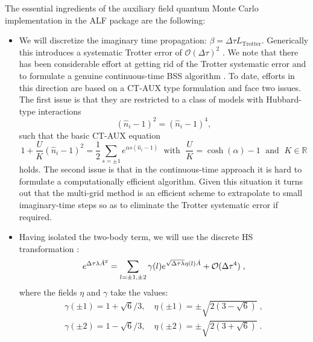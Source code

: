 \documentclass{SciPost}
\begin{document}
The essential ingredients of the auxiliary field quantum Monte Carlo implementation in the ALF package are the following:
\begin{itemize}
\item  We will discretize the imaginary time propagation: $\beta = \Delta \tau L_{\text{Trotter}} $. Generically this introduces a systematic Trotter error of $\mathcal{O}(\Delta \tau)^2$  \cite{Fye86}. 
We note that there has been considerable effort at getting rid of the Trotter systematic error and to 
formulate a genuine continuous-time BSS  algorithm \cite{Iazzi15}.   To date, efforts in this direction are based on a CT-AUX type formulation \cite{Rombouts99,Gull08} and   face  two issues. The first issue is that they are restricted to a class of models with Hubbard-type interactions
\begin{equation}
        \left(  \hat{n}_{i}- 1\right)^{2}  = \left(  \hat{n}_{i}- 1\right)^{4} ,
\end{equation}
such that  the  basic CT-AUX equation \cite{Rombouts98}
\begin{equation}
          1   + \frac{U}{K} \left(  \hat{n}_{i}- 1\right)^{2}    = \frac{1}{2}\sum_{s=\pm 1}   e^{ \alpha s \left(  \hat{n}_{i}- 1\right) }  \; \text{ with  }  \;  \frac{U}{K} = \cosh(\alpha) -1 \; \text{ and  }  \; K\in\mathbb{R}
\end{equation}
holds.
The second issue is that in the continuous-time  approach it is hard to formulate a  computationally efficient algorithm.  Given this situation it turns out that the multi-grid method \cite{Rost12,Rost13,Bluemer08}  is an efficient  scheme to   extrapolate to  small imaginary-time steps so as to  eliminate the Trotter systematic error if required.
\item  Having isolated the two-body term,  we will use  the   discrete HS transformation \cite{Motome97,Assaad97}:
\begin{equation}
\label{HS_squares}
        e^{\Delta \tau  \lambda  \hat{A}^2 } =
        \sum_{ l = \pm 1, \pm 2}  \gamma(l)
e^{ \sqrt{\Delta \tau \lambda }
       \eta(l)  \hat{A} }
                + {\cal O} (\Delta \tau ^4)\;,
\end{equation}
where the fields $\eta$ and $\gamma$ take the values:
\begin{eqnarray}
 \gamma(\pm 1)  = 1 + \sqrt{6}/3, \quad  \eta(\pm 1 ) = \pm \sqrt{2 \left(3 - \sqrt{6} \right)}\;,\\\nonumber
  \gamma(\pm 2) = 1 - \sqrt{6}/3, \quad  \eta(\pm 2 ) = \pm \sqrt{2 \left(3 + \sqrt{6} \right)}\;.

\end{eqnarray}
\end{itemize}
\end{document}
